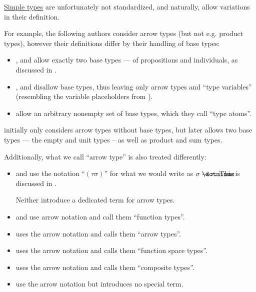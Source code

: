 \begin{remark}\label{rem:simple_type_terminology_and_notation}
  \hyperref[def:simple_type]{Simple types} are unfortunately not standardized, and naturally, allow variations in their definition.

  For example, the following authors consider arrow types (but not e.g. product types), however their definitions differ by their handling of base types:
  \begin{itemize}
    \item {},  and  allow exactly two base types --- of propositions and individuals, as discussed in .

    \item {},  and  disallow base types, thus leaving only arrow types and \enquote{type variables} (resembling the variable placeholders from ).

    \item {} allow an arbitrary nonempty set of base types, which they call \enquote{type atoms}.
  \end{itemize}

   initially only considers arrow types without base types, but later allows two base types --- the empty and unit types -- as well as product and sum types.

  Additionally, what we call \enquote{arrow type} is also treated differently:
  \begin{itemize}
    \item {} and  use the notation \enquote{\( (\tau\sigma) \)} for what we would write as \( \sigma \synimplies \tau \). This is discussed in .

    Neither introduce a dedicated term for arrow types.

    \item {} and  use arrow notation and call them \enquote{function types}.

    \item {} uses the arrow notation and calls them \enquote{arrow types}.

    \item {} uses the arrow notation and calls them \enquote{function space types}.

    \item {} uses the arrow notation and calls them \enquote{composite types}.

    \item {} use the arrow notation but introduces no special term.
  \end{itemize}
\end{remark}

